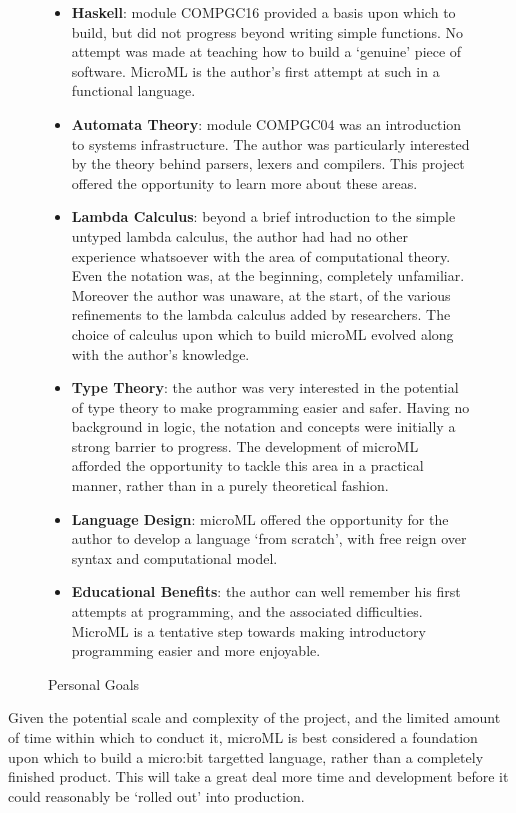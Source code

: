 \documentclass[12pt, a4paper]{report}
\begin{document}
\begin{figure}[H]
    \begin{itemize}
        \item \textbf{Haskell}: module COMPGC16 provided a basis upon which to build, but did not
            progress beyond writing simple functions. No attempt was made at teaching how to build a
            `genuine' piece of software. MicroML is the author's first attempt at such in a
            functional language.
        \item \textbf{Automata Theory}: module COMPGC04 was an introduction to systems infrastructure. The
            author was particularly interested by the theory behind parsers, lexers and compilers.
            This project offered the opportunity to learn more about these areas.
        \item \textbf{Lambda Calculus}:  beyond a brief introduction to the simple untyped lambda
            calculus, the author had had no other experience whatsoever with the area of computational
            theory. Even the notation was, at the beginning, completely unfamiliar. Moreover the
            author was unaware, at the start, of the various refinements to the lambda calculus added
            by researchers. The choice of calculus upon which to build microML evolved along with
            the author's knowledge.
        \item \textbf{Type Theory}: the author was very interested in the potential of type theory to make
            programming easier and safer. Having no background in logic, the notation and concepts
            were initially a strong barrier to progress. The development of microML afforded the
            opportunity to tackle this area in a practical manner, rather than in a purely
            theoretical fashion.
        \item \textbf{Language Design}: microML offered the opportunity for the author to develop a language
            `from scratch', with free reign over syntax and computational model. 
        \item \textbf{Educational Benefits}: the author can well remember his first attempts at programming,
            and the associated difficulties. MicroML is a tentative step towards making introductory
            programming easier and more enjoyable.
    \end{itemize}
    \caption{Personal Goals}
\label{fig:intentions}
\end{figure}

Given the potential scale and complexity of the project, and the limited amount of time within which
to conduct it, microML is best considered a foundation upon which to build a micro:bit targetted
language, rather than a completely finished product. This will take a great deal more time and
development before it could reasonably be `rolled out' into production.
\end{document}
